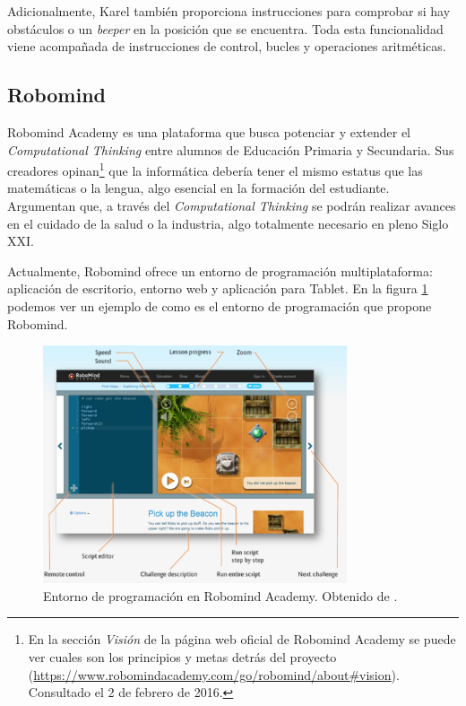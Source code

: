 Adicionalmente, Karel también proporciona instrucciones para comprobar si hay obstáculos o un \emph{beeper} en la posición que se encuentra. Toda esta funcionalidad viene acompañada de instrucciones de control, bucles y operaciones aritméticas.




\subsection{Robomind}
\label{sec:robomind}


Robomind Academy\cite{robomind-web} es una plataforma que busca potenciar y extender el \emph{Computational Thinking} entre alumnos de Educación Primaria y Secundaria. Sus creadores opinan\footnote{En la sección \emph{Visión} de la página web oficial de Robomind Academy se puede ver cuales son los principios y metas detrás del proyecto (\url{https://www.robomindacademy.com/go/robomind/about#vision}). Consultado el 2 de febrero de 2016.} que la informática debería tener el mismo estatus que las matemáticas o la lengua, algo esencial en la formación del estudiante. Argumentan que, a través del \emph{Computational Thinking} se podrán realizar avances en el cuidado de la salud o la industria, algo totalmente necesario en pleno Siglo XXI. 


Actualmente, Robomind ofrece un entorno de programación multiplataforma: aplicación de escritorio, entorno web y aplicación para Tablet. En la figura \ref{fig:robomind-entorno} podemos ver un ejemplo de como es el entorno de programación que propone Robomind.


\begin{figure}[!ht]
	\begin{centering}
		\includegraphics[width=0.8\textwidth]{images/robomind-entorno.png}
			\caption{Entorno de programación en Robomind Academy. Obtenido de \cite{robomind-web}.}
				\label{fig:robomind-entorno}
	\end{centering}
\end{figure}


